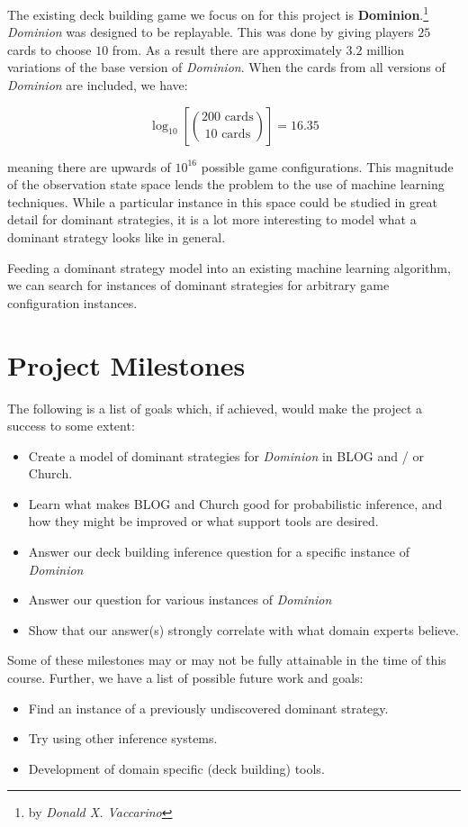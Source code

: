 \documentclass{acm_proc_article-sp}
\begin{document}
The existing deck building game we focus on for this project
is {\bf Dominion}.\footnote{by \emph{Donald X. Vaccarino}}
\emph{Dominion} was designed to be replayable. This was done by giving players
$25$ cards to choose $10$ from. As a result there are approximately $3.2$
million variations of the base version of \emph{Dominion}. When the cards from
all versions of \emph{Dominion} are included, we have:

$$\log_{10}{\left[\binom{200 \text{ cards}}{10 \text{ cards}}\right]} = 16.35$$

meaning there are upwards of $10^{16}$ possible game configurations. This
magnitude of the observation state space lends the problem to the use
of machine learning techniques. While a particular instance in this space
could be studied in great detail for dominant strategies, it is a lot more
interesting to model what a dominant strategy looks like in general.

Feeding a dominant strategy model into an existing machine learning algorithm,
we can search for instances of dominant strategies for arbitrary game
configuration instances.

\section{Project Milestones}

The following is a list of goals which, if achieved, would make the project
a success to some extent:

\begin{itemize}
\item Create a model of dominant strategies for \emph{Dominion} in BLOG and / or Church.
\item Learn what makes BLOG and Church good for probabilistic inference, and how they might
      be improved or what support tools are desired.
\item Answer our deck building inference question for a specific instance of \emph{Dominion}
\item Answer our question for various instances of \emph{Dominion}
\item Show that our answer(s) strongly correlate with what domain experts believe.
\end{itemize}

Some of these milestones may or may not be fully attainable in the time of this
course. Further, we have a list of possible future work and goals:

\begin{itemize}
\item Find an instance of a previously undiscovered dominant strategy.
\item Try using other inference systems.
\item Development of domain specific (deck building) tools.
\end{itemize}

\begin{biblist}
\end{biblist}

\balancecolumns
\end{document}
